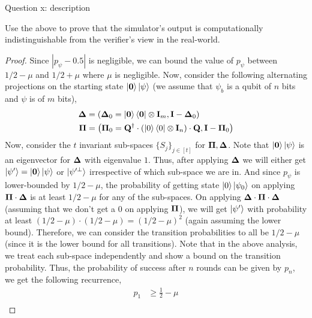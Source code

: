 \begin{solution}{Question x: description}\label{ques:53}
    \begin{question}
        Use the above to prove that the simulator's output is computationally indistinguishable from the verifier’s view in the real-world.
    \end{question}
    \tcblower{}
    \begin{proof}
        Since $|p_\psi - 0.5|$ is negligible, we can bound the value of $p_\psi$ between $1/2-\mu$ and $1/2+\mu$ where $\mu$ is negligible. Now, consider the following alternating projections on the starting state $\ket{\mathbf{0}}\ket{\psi}$ (we assume that $\psi_b$ is a qubit of $n$ bits and $\psi$ is of $m$ bits),
        \begin{equation}
            \begin{split}
                \mathbf{\Delta} &= \left(\mathbf{\Delta}_0 = \ket{\mathbf{0}}\bra{\mathbf{0}}\otimes\mathbf{I}_m, \mathbf{I} - \mathbf{\Delta}_0\right)\\
                \mathbf{\Pi} &= \left(\mathbf{\Pi}_0 = \mathbf{Q}^\dagger\cdot(\ket{0}\bra{0}\otimes \mathbf{I}_n)\cdot\mathbf{Q}, \mathbf{I} - \mathbf{\Pi}_0\right)
            \end{split}
        \end{equation}
        Now, consider the $t$ invariant sub-spaces $\{S_j\}_{j\in[t]}$ for $\mathbf{\Pi}, \mathbf{\Delta}$. Note that $\ket{\mathbf{0}}\ket{\psi}$ is an eigenvector for $\mathbf{\Delta}$ with eigenvalue $1$. Thus, after applying $\mathbf{\Delta}$ we will either get $\ket{\psi'} = \ket{\mathbf{0}}\ket{\psi}$ or $\ket{\psi'^\perp}$ irrespective of which sub-space we are in. And since $p_\psi$ is lower-bounded by $1/2-\mu$, the probability of getting state $\ket{0}\ket{\psi_0}$ on applying $\mathbf{\Pi}\cdot\mathbf{\Delta}$ is at least $1/2-\mu$ for any of the sub-spaces. On applying $\mathbf{\Delta}\cdot\mathbf{\Pi}\cdot\mathbf{\Delta}$ (assuming that we don't get a $0$ on applying $\mathbf{\Pi}$), we will get $\ket{\psi'}$ with probability at least $(1/2-\mu)\cdot(1/2-\mu) = (1/2-\mu)^2$ (again assuming the lower bound). Therefore, we can consider the transition probabilities to all be $1/2-\mu$ (since it is the lower bound for all transitions). Note that in the above analysis, we treat each sub-space independently and show a bound on the transition probability. Thus, the probability of success after $n$ rounds can be given by $p_n$, we get the following recurrence,
        \begin{equation}
            \begin{split}
                p_1 &\geq \frac{1}{2}-\mu\\

\end{split}
\end{equation}
\end{proof}
\end{solution}
